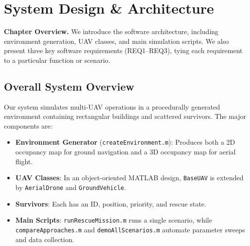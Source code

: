 \documentclass[12pt,a4paper]{report}
\begin{document}
\chapter{System Design \& Architecture}
\label{cha:system_design}

\textbf{Chapter Overview.} We introduce the software architecture, including environment
generation, UAV classes, and main simulation scripts. We also present three key software
requirements (REQ1–REQ3), tying each requirement to a particular function or scenario.

\section{Overall System Overview}
Our system simulates multi-UAV operations in a procedurally generated environment containing
rectangular buildings and scattered survivors. The major components are:

\begin{itemize}
  \item \textbf{Environment Generator} (\texttt{createEnvironment.m}): Produces both
  a 2D occupancy map for ground navigation and a 3D occupancy map for aerial flight.
  \item \textbf{UAV Classes}: In an object-oriented MATLAB design, \texttt{BaseUAV}
  is extended by \texttt{AerialDrone} and \texttt{GroundVehicle}.
  \item \textbf{Survivors}: Each has an ID, position, priority, and rescue state.
  \item \textbf{Main Scripts}: \texttt{runRescueMission.m} runs a single scenario,
  while \texttt{compareApproaches.m} and \texttt{demoAllScenarios.m} automate parameter
  sweeps and data collection.
\end{itemize}
\end{document}
